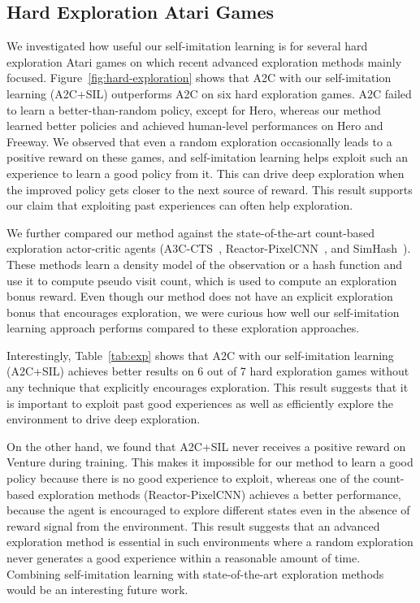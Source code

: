 \documentclass{article}
\begin{document}
\subsection{Hard Exploration Atari Games} \label{sec:exp-hard}
\cutsubsectiondown
We investigated how useful our self-imitation learning is for several hard exploration Atari games on which recent advanced exploration methods mainly focused. Figure~\ref{fig:hard-exploration} shows that A2C with our self-imitation learning (A2C+SIL) outperforms A2C on six hard exploration games. A2C failed to learn a better-than-random policy, except for Hero, whereas our method learned better policies and achieved human-level performances on Hero and Freeway. We observed that even a random exploration occasionally leads to a positive reward on these games, and self-imitation learning helps exploit such an experience to learn a good policy from it. This can drive deep exploration when the improved policy gets closer to the next source of reward. This result supports our claim that exploiting past experiences can often help exploration.

We further compared our method against the state-of-the-art count-based exploration actor-critic agents (A3C-CTS~\citep{bellemare2016unifying}, Reactor-PixelCNN~\citep{ostrovski2017count}, and SimHash~\citep{tang2017exploration}). These methods learn a density model of the observation or a hash function and use it to compute pseudo visit count, which is used to compute an exploration bonus reward. Even though our method does not have an explicit exploration bonus that encourages exploration, we were curious how well our self-imitation learning approach performs compared to these exploration approaches.

Interestingly, Table~\ref{tab:exp} shows that A2C with our self-imitation learning (A2C+SIL) achieves better results on 6 out of 7 hard exploration games without any technique that explicitly encourages exploration. This result suggests that it is important to exploit past good experiences as well as efficiently explore the environment to drive deep exploration.

On the other hand, we found that A2C+SIL never receives a positive reward on Venture during training. This makes it impossible for our method to learn a good policy because there is no good experience to exploit, whereas one of the count-based exploration methods (Reactor-PixelCNN) achieves a better performance, because the agent is encouraged to explore different states even in the absence of reward signal from the environment. This result suggests that an advanced exploration method is essential in such environments where a random exploration never generates a good experience within a reasonable amount of time. 
Combining self-imitation learning with state-of-the-art exploration methods would be an interesting future work.
\end{document}
